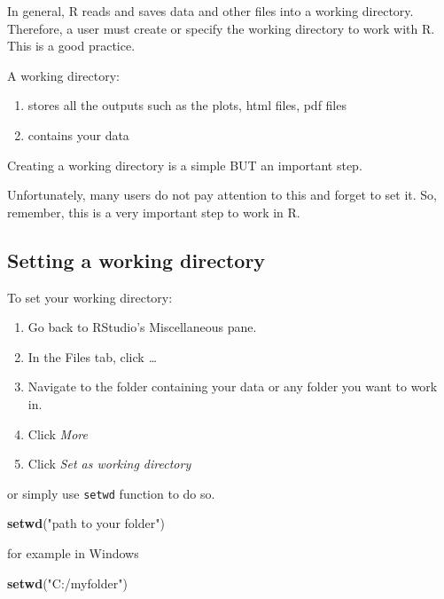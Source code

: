 \documentclass[]{book}
\newenvironment{Shaded}{\begin{snugshade}}{\end{snugshade}}
\newcommand{\KeywordTok}[1]{\textcolor[rgb]{0.13,0.29,0.53}{\textbf{{#1}}}}
\newcommand{\StringTok}[1]{\textcolor[rgb]{0.31,0.60,0.02}{{#1}}}
\newcommand{\NormalTok}[1]{{#1}}
\providecommand{\tightlist}{%
  \setlength{\itemsep}{0pt}\setlength{\parskip}{0pt}}
\theoremstyle{definition}
\theoremstyle{definition}
\theoremstyle{remark}
\begin{document}
In general, R reads and saves data and other files into a working
directory. Therefore, a user must create or specify the working
directory to work with R. This is a good practice.

A working directory:

\begin{enumerate}
\def\labelenumi{\arabic{enumi}.}
\tightlist
\item
  stores all the outputs such as the plots, html files, pdf files
\item
  contains your data
\end{enumerate}

Creating a working directory is a simple BUT an important step.

Unfortunately, many users do not pay attention to this and forget to set
it. So, remember, this is a very important step to work in R.

\subsection{Setting a working
directory}\label{setting-a-working-directory}

To set your working directory:

\begin{enumerate}
\def\labelenumi{\arabic{enumi}.}
\tightlist
\item
  Go back to RStudio's Miscellaneous pane.
\item
  In the Files tab, click \emph{\ldots{}}
\item
  Navigate to the folder containing your data or any folder you want to
  work in.
\item
  Click \emph{More}
\item
  Click \emph{Set as working directory}
\end{enumerate}

or simply use \texttt{setwd} function to do so.

\begin{Shaded}
\begin{Highlighting}[]
\KeywordTok{setwd}\NormalTok{(}\StringTok{"path to your folder"}\NormalTok{)}
\end{Highlighting}
\end{Shaded}

for example in Windows

\begin{Shaded}
\begin{Highlighting}[]
\KeywordTok{setwd}\NormalTok{(}\StringTok{"C:/myfolder"}\NormalTok{)}
\end{Highlighting}
\end{Shaded}
\end{document}
